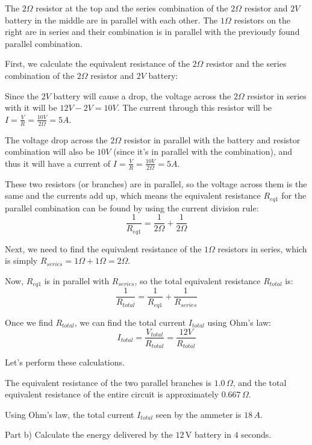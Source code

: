 \documentclass[a4paper,11pt]{article}
\begin{document}
The \(2\Omega\) resistor at the top and the series combination of the \(2\Omega\) resistor and \(2V\) battery in the middle are in parallel with each other. The \(1\Omega\) resistors on the right are in series and their combination is in parallel with the previously found parallel combination.

First, we calculate the equivalent resistance of the \(2\Omega\) resistor and the series combination of the \(2\Omega\) resistor and \(2V\) battery:

Since the \(2V\) battery will cause a drop, the voltage across the \(2\Omega\) resistor in series with it will be \( 12V - 2V = 10V \). The current through this resistor will be \( I = \frac{V}{R} = \frac{10V}{2\Omega} = 5A \).

The voltage drop across the \(2\Omega\) resistor in parallel with the battery and resistor combination will also be \(10V\) (since it's in parallel with the combination), and thus it will have a current of \( I = \frac{V}{R} = \frac{10V}{2\Omega} = 5A \).

These two resistors (or branches) are in parallel, so the voltage across them is the same and the currents add up, which means the equivalent resistance \( R_{eq1} \) for the parallel combination can be found by using the current division rule:
\[ \frac{1}{R_{eq1}} = \frac{1}{2\Omega} + \frac{1}{2\Omega} \]

Next, we need to find the equivalent resistance of the \(1\Omega\) resistors in series, which is simply \( R_{series} = 1\Omega + 1\Omega = 2\Omega \).

Now, \( R_{eq1} \) is in parallel with \( R_{series} \), so the total equivalent resistance \( R_{total} \) is:
\[ \frac{1}{R_{total}} = \frac{1}{R_{eq1}} + \frac{1}{R_{series}} \]

Once we find \( R_{total} \), we can find the total current \( I_{total} \) using Ohm's law:
\[ I_{total} = \frac{V_{total}}{R_{total}} = \frac{12V}{R_{total}} \]

Let's perform these calculations.

The equivalent resistance of the two parallel branches is \(1.0 \, \Omega\), and the total equivalent resistance of the entire circuit is approximately \(0.667 \, \Omega\). 

Using Ohm's law, the total current \(I_{total}\) seen by the ammeter is \(18 \, A\).

Part b) Calculate the energy delivered by the \(12\, \text{V}\) battery in \(4\) seconds.
\end{document}
